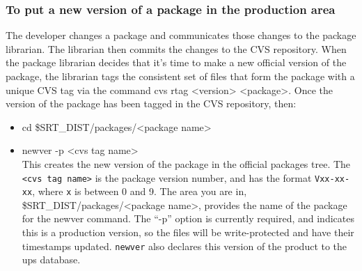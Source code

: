 \documentclass[12pt]{article}
\begin{document}
\subsubsection{To put a new version of a package in the production area}
\label{sec_newver}

The developer changes a package and communicates those changes to the
package librarian. The librarian then commits the changes to the 
CVS
repository. When the package librarian decides that it's time to make a 
new official version of the package, the librarian tags the consistent set of 
files that form the package with a unique CVS tag via the command 
{\ttfamily cvs rtag <version> <package>}. 
Once the version of the package has been tagged 
in the CVS repository, then:
\begin{itemize}
\item {\ttfamily cd \$SRT\_DIST/packages/<package name>}
\item {\ttfamily newver -p <cvs tag name>}\\
This creates the new version of the package  in the official packages tree.  
The \texttt{<cvs tag name>} is the package version number, and has the format
\texttt{Vxx-xx-xx}, where \texttt{x} is between 0 and 9. The 
area you are in, {\ttfamily \$SRT\_DIST/packages/<package name>}, provides the
name of the package for the {\ttfamily newver} command.  The ``-p'' option 
is currently required, and indicates this is a production version, so the 
files will be write-protected and have their timestamps updated.
\texttt{newver} also declares this version of the product to the ups
database. 
\end{itemize}
\end{document}
